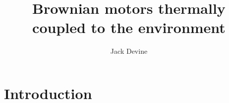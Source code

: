 \documentclass[11pt]{article} %
\title{Brownian motors thermally coupled to the environment}
\author{Jack Devine}
\begin{document}
\maketitle

\tableofcontents

%
%




\section{Introduction}
\end{document}
